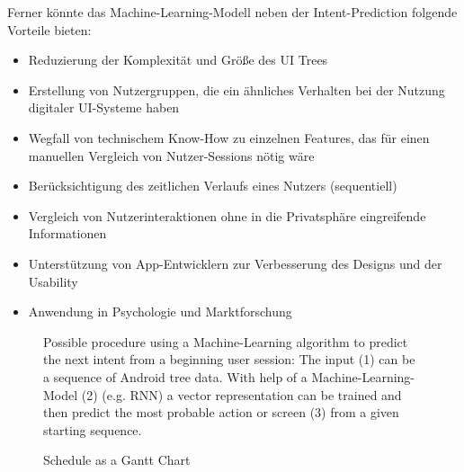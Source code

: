 Ferner könnte das Machine-Learning-Modell neben der Intent-Prediction folgende Vorteile bieten:
\begin{itemize}
  \item Reduzierung der Komplexität und Größe des UI Trees
  \item Erstellung von Nutzergruppen, die ein ähnliches Verhalten bei der Nutzung digitaler UI-Systeme haben
  \item Wegfall von technischem Know-How zu einzelnen Features, das für einen manuellen Vergleich von Nutzer-Sessions nötig wäre \cite{ghods2019activity2vec}
  \item Berücksichtigung des zeitlichen Verlaufs eines Nutzers (sequentiell)
  \item Vergleich von Nutzerinteraktionen ohne in die Privatsphäre eingreifende Informationen
  \item Unterstützung von App-Entwicklern zur Verbesserung des Designs und der Usability
  \item Anwendung in Psychologie und Marktforschung
\end{itemize}

\begin{figure}[htbp!]
  \centering
  
  \caption{Possible procedure using a Machine-Learning algorithm to predict the next intent from a beginning user session: The input (1) can be a sequence of Android tree data. With help of a Machine-Learning-Model (2) (e.g. RNN) a vector representation can be trained and then predict the most probable action or screen (3) from a given starting sequence.}
  \label{fig:encode-decode}
\end{figure}

\begin{figure}[htbp!]
  \centering
  
  \caption{Schedule as a Gantt Chart}
  \label{fig:schedule}
\end{figure}
